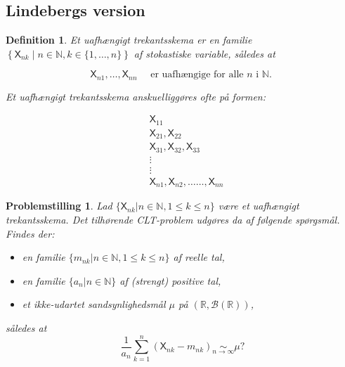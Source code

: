 \documentclass{article}
\newcommand{\N}{\mathbb{N}}
\newcommand{\R}{\mathbb{R}}
\newcommand{\1}{\mathbbm{1}}
\newcommand{\X}{\mathsf{X}}
\theoremstyle{boxed}
\newtheorem{definition}[theorem]{Definition}
\newtheorem{problemstilling}[theorem]{Problemstilling}
\begin{document}
\subsection{Lindebergs version}
\begin{theorem-box}
    \begin{definition}
        Et uafhængigt trekantsskema er en familie $\left\{\X_{n k} \mid n \in \mathbb{N}, k \in\{1, \ldots, n\}\right\}$ af stokastiske variable, således at

$$
\X_{n 1}, \ldots, \X_{n n} \quad \text { er uafhængige for alle } n \text { i } \mathbb{N} \text {. }
$$


Et uafhængigt trekantsskema anskuelliggøres ofte på formen:

$$
\begin{aligned}
& \X_{11} \\
& \X_{21}, \X_{22} \\
& \X_{31}, \X_{32}, \X_{33} \\
& \vdots \\
& \vdots \\
& \X_{n 1}, \X_{n 2}, \ldots \ldots, \X_{n n}
\end{aligned}
$$

    \end{definition}
\end{theorem-box}
\begin{theorem-box}
    \begin{problemstilling}
        Lad $\{\X_{nk}|n\in\N,1\leq k \leq n\}$ være et uafhængigt trekantsskema. Det tilhørende CLT-problem udgøres da af følgende spørgsmål. Findes der:
        \begin{itemize}
            \item en familie $\{m_{nk}|n\in\N,  1\leq k \leq n\}$ af reelle tal,
            \item en familie $\{a_n|n\in\N\}$ af (strengt) positive tal,
            \item et ikke-udartet sandsynlighedsmål $\mu$ på $(\R, \mathcal{B}(\R))$,
        \end{itemize}
        således at 
        $$\frac{1}{a_n} \sum_{k=1}^n\left(\X_{n k}-m_{n k}\right) \underset{n \rightarrow \infty}{\sim} \mu ?$$
    \end{problemstilling}
\end{theorem-box}
\end{document}
